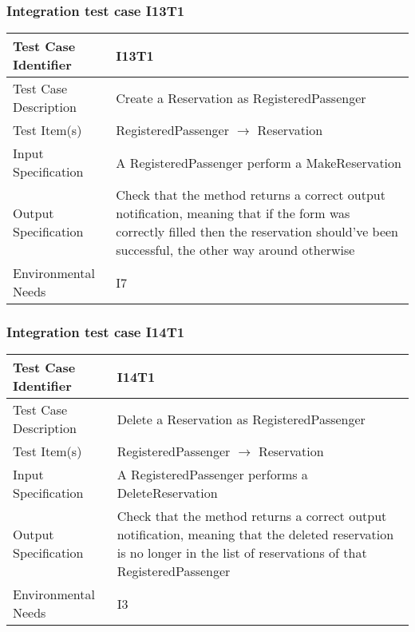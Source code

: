 \subsubsection{Integration test case I13T1}
\begin{center}
  \begin{tabular}{ |l p{10cm}| } \hline
    Test Case Identifier & I13T1 \\ \hline
    Test Case Description & Create a Reservation as RegisteredPassenger \\ \hline
    Test Item(s) & RegisteredPassenger $\rightarrow$ Reservation \\ \hline
    Input Specification & A RegisteredPassenger perform a MakeReservation \\ \hline
    Output Specification & Check that the method returns a correct output notification, meaning that if the form was correctly filled then
    the reservation should've been successful, the other way around otherwise\\ \hline
    Environmental Needs & I7 \\ \hline
  \end{tabular}
\end{center}
\subsubsection{Integration test case I14T1}
\begin{center}
  \begin{tabular}{ |l p{10cm}| } \hline
    Test Case Identifier & I14T1 \\ \hline
    Test Case Description & Delete a Reservation as RegisteredPassenger \\ \hline
    Test Item(s) & RegisteredPassenger $\rightarrow$ Reservation \\ \hline
    Input Specification & A RegisteredPassenger performs a DeleteReservation\\ \hline
    Output Specification & Check that the method returns a correct output notification, meaning that the deleted reservation is no longer in the
    list of reservations of that RegisteredPassenger \\ \hline
    Environmental Needs & I3 \\ \hline
  \end{tabular}
\end{center}
